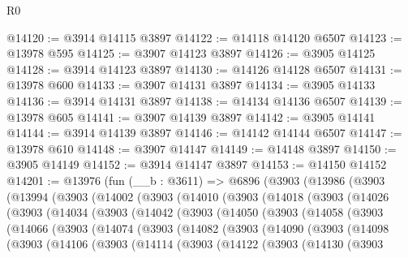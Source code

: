 \begin{lexlean}{R0}
\begin{coremodule}
@14120 := @3914 @14115 @3897
@14122 := @14118 @14120 @6507
@14123 := @13978 @595
@14125 := @3907 @14123 @3897
@14126 := @3905 @14125
@14128 := @3914 @14123 @3897
@14130 := @14126 @14128 @6507
@14131 := @13978 @600
@14133 := @3907 @14131 @3897
@14134 := @3905 @14133
@14136 := @3914 @14131 @3897
@14138 := @14134 @14136 @6507
@14139 := @13978 @605
@14141 := @3907 @14139 @3897
@14142 := @3905 @14141
@14144 := @3914 @14139 @3897
@14146 := @14142 @14144 @6507
@14147 := @13978 @610
@14148 := @3907 @14147
@14149 := @14148 @3897
@14150 := @3905 @14149
@14152 := @3914 @14147 @3897
@14153 := @14150 @14152
@14201 := @13976
    (fun (__b : @3611) =>
    @6896
      (@3903
        (@13986
          (@3903
            (@13994
              (@3903
                (@14002
                  (@3903
                    (@14010
                      (@3903
                        (@14018
                          (@3903
                            (@14026
                              (@3903
                                (@14034
                                  (@3903
                                    (@14042
                                      (@3903
                                        (@14050
                                          (@3903
                                            (@14058
                                              (@3903
                                                (@14066
                                                  (@3903
                                                    (@14074
                                                      (@3903
                                                        (@14082
                                                          (@3903
                                                            (@14090
                                                              (@3903
                                                                (@14098
                                                                  (@3903
                                                                    (@14106
                                                                      (@3903
                                                                        (@14114
                                                                          (@3903
                                                                            (@14122
                                                                              (@3903
                                                                                (@14130
                                                                                  (@3903

\end{coremodule}
\end{lexlean}
